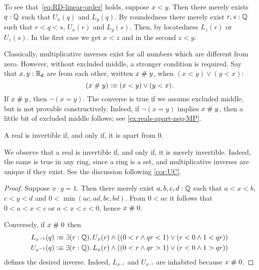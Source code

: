To see that~\eqref{eq:RD-linear-order} holds, suppose $x < y$. Then there merely exists $q : \mathbb{Q}$ such that $U_x(q)$ and
$L_y(q)$. By roundedness there merely exist $r, s : \mathbb{Q}$ such that $r < q < s$, $U_x(r)$
and $L_y(s)$. Then, by locatedness $L_z(r)$ or $U_z(s)$. In the first case we get $x < z$
and in the second $z < y$. 

Classically, multiplicative inverses exist for all numbers which are different from zero.
However, without excluded middle, a stronger condition is required. Say that $x, y : \mathbb{R}_\mathsf{d}$
are 
from each other, written $x \mathrel{\#} y$, when $(x < y) \lor (y < x)$:
%
\begin{equation*}
  (x \mathrel{\#} y) \vcentcolon\equiv (x < y) \lor (y < x).
\end{equation*}
%
If $x \mathrel{\#} y$, then $\lnot (x = y)$.
The converse is true if we assume excluded middle, but is not provable constructively.
Indeed, if $\lnot (x = y)$ implies $x\mathrel{\#} y$, then a little bit of excluded middle follows; see \autoref{ex:reals-apart-neq-MP}.

\begin{thm} \label{RD-inverse-apart-0}
  A real is invertible if, and only if, it is apart from $0$.
\end{thm}

\begin{rmk}
  We observe that a real is invertible if, and only if, it is merely
  invertible.  Indeed, the same is true in any ring, since a ring is a set, and
  multiplicative inverses are unique if they exist.  See the discussion
  following \autoref{cor:UC}.
\end{rmk}

\begin{proof}
  Suppose $x \cdot y = 1$. Then there merely exist $a, b, c, d : \mathbb{Q}$ such that
  $a < x < b$, $c < y < d$ and $0 < \min (a c, a d, b c, b d)$. From $0 < a c$ it follows
  that $0 < a < x < c$ or $a < x < c < 0$, hence $x \mathrel{\#} 0$.

  Conversely, if $x \mathrel{\#} 0$ then
  \begin{align*}
    L_{x^{-1}}(q) &\defeq
    \exis{r : \Q} U_x(r) \land ((0 < r \land q r < 1) \lor (r < 0 \land 1 < q r))
    \\
    U_{x^{-1}}(q) &\defeq
    \exis{r : \Q} L_x(r) \land ((0 < r \land q r > 1) \lor (r < 0 \land 1 > q r))
  \end{align*}
  defines the desired inverse. Indeed, $L_{x^{-1}}$ and $U_{x^{-1}}$ are inhabited because
  $x \mathrel{\#} 0$.
\end{proof}

